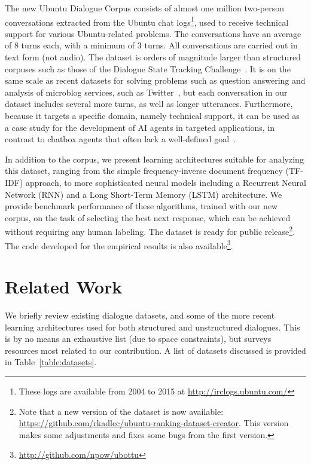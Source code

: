 \documentclass[11pt,a4paper]{article}
\begin{document}
The new Ubuntu Dialogue Corpus consists of almost one million two-person conversations extracted from the Ubuntu chat logs\footnote{These logs are available from 2004 to 2015 at \url{http://irclogs.ubuntu.com/}}, used to receive technical support for various Ubuntu-related problems. The conversations have an average of 8 turns each, with a minimum of 3 turns. All conversations are carried out in text form (not audio).  The dataset is orders of magnitude larger than structured corpuses such as those of the Dialogue State Tracking Challenge~\cite{williams2013dialog}.  It is on the same scale as recent datasets for solving problems such as question answering and analysis of microblog services, such as Twitter~\cite{yu2014deep,sordoni2015, shang2015neural,ritter2011data}, but each conversation in our dataset includes several more turns, as well as longer utterances.  Furthermore, because it targets a specific domain, namely technical support, it can be used as a case study for the development of AI agents in targeted applications, in contrast to chatbox agents that often lack a well-defined goal~\cite{shawar2007chatbots}.



In addition to the corpus, we present learning architectures suitable for analyzing this dataset, ranging from the simple frequency-inverse document frequency (TF-IDF) approach, to more sophisticated neural models including a Recurrent Neural Network (RNN) and a Long Short-Term Memory (LSTM) architecture. We provide benchmark performance of these algorithms, trained with our new corpus, on the task of selecting the best next response, which can be achieved without requiring any human labeling.  The dataset is ready for public release\footnote{Note that a new version of the dataset is now available: \url{https://github.com/rkadlec/ubuntu-ranking-dataset-creator}. This version makes some adjustments and fixes some bugs from the first version.}. 
The code developed for the empirical results is also available\footnote{\url{http://github.com/npow/ubottu}}.

\section{Related Work}

We briefly review existing dialogue datasets, and some of the more recent learning architectures used for both structured and unstructured dialogues. This is by no means an exhaustive list (due to space constraints), but surveys resources most related to our contribution. A list of datasets discussed is provided in Table~\ref{table:datasets}. 
\end{document}
